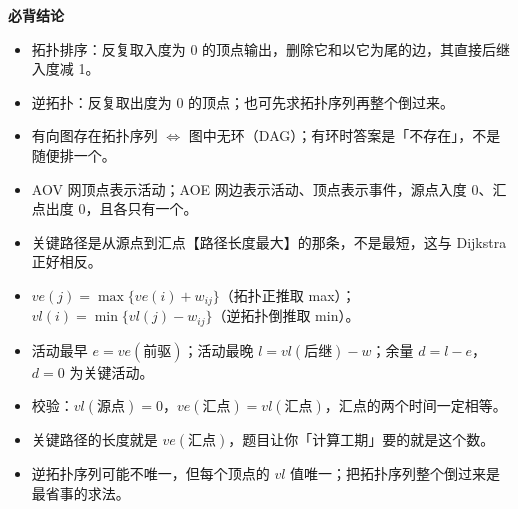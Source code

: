 \documentclass[10pt,a4paper]{ctexart}
\begin{document}






\textbf{必背结论}

\begin{itemize}

\item 拓扑排序：反复取入度为 0 的顶点输出，删除它和以它为尾的边，其直接后继入度减 1。

\item 逆拓扑：反复取出度为 0 的顶点；也可先求拓扑序列再整个倒过来。

\item 有向图存在拓扑序列 $\iff$ 图中无环（DAG）；有环时答案是「不存在」，不是随便排一个。

\item AOV 网顶点表示活动；AOE 网边表示活动、顶点表示事件，源点入度 0、汇点出度 0，且各只有一个。

\item 关键路径是从源点到汇点【路径长度最大】的那条，不是最短，这与 Dijkstra 正好相反。

\item $ve(j)=\max\{ve(i)+w_{ij}\}$（拓扑正推取 max）；$vl(i)=\min\{vl(j)-w_{ij}\}$（逆拓扑倒推取 min）。

\item 活动最早 $e=ve(\text{前驱})$；活动最晚 $l=vl(\text{后继})-w$；余量 $d=l-e$，$d=0$ 为关键活动。

\item 校验：$vl(\text{源点})=0$，$ve(\text{汇点})=vl(\text{汇点})$，汇点的两个时间一定相等。

\item 关键路径的长度就是 $ve(\text{汇点})$，题目让你「计算工期」要的就是这个数。

\item 逆拓扑序列可能不唯一，但每个顶点的 $vl$ 值唯一；把拓扑序列整个倒过来是最省事的求法。

\end{itemize}
\end{document}
